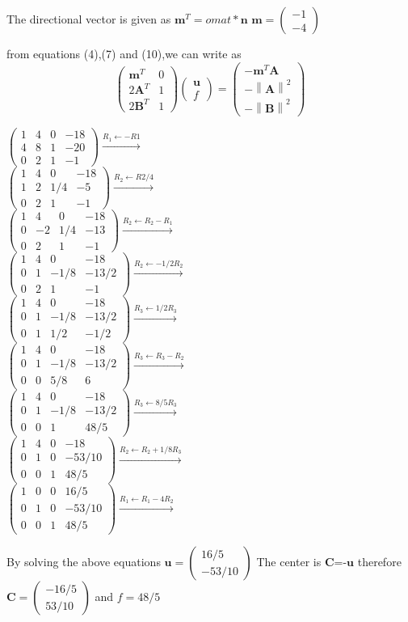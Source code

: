 \documentclass[journal,12pt,twocolumn]
{IEEEtran}
\providecommand{\norm}[1]{\left\lVert#1\right\rVert}
\let\vec\mathbf
\newcommand{\myvec}[1]{\ensuremath{\begin{pmatrix}#1\end{pmatrix}}}
\begin{document}
\begin{center}
The directional vector is given as $\vec{m}^T=omat*\vec{n}$ $\vec{m}=\myvec{-1 \\-4}$
\end{center}
from equations (4),(7) and (10),we can write as 
\begin{equation}
	\myvec{\vec{m}^T & 0 \\ 2\vec{A}^T & 1 \\ 2\vec{B}^T & 1}\myvec{\vec{u} \\ f} = \myvec{-\vec{m}^T\vec{A} \\ -\norm{\vec{A}}^2 \\ -\norm{\vec{B}}^2}
\end{equation}

\begin{center}
$\myvec{1&4&0&-18 \\4 & 8& 1 & -20 \\ 0 & 2 & 1 & -1 } \xrightarrow[]{R_1 \leftarrow -R1 }$\\
$\myvec{1&4&0&-18 \\1 & 2 & 1/4 & -5 \\ 0 & 2 & 1 & -1 } \xrightarrow[]{R_2 \leftarrow R2 / 4 } $\\
$\myvec{1&4&0&-18 \\0 & -2 & 1/4 & -13 \\ 0 & 2 & 1 & -1 } \xrightarrow[]{R_2 \leftarrow  R_2-R_1 }$\\
$\myvec{1&4&0&-18 \\0 & 1 & -1/8 & -13/2 \\ 0 & 2 & 1 & -1 } \xrightarrow[]{R_2 \leftarrow - 1/2R_2 }$\\
$\myvec{1&4&0&-18 \\0 & 1 & -1/8 & -13/2 \\ 0 & 1 & 1/2 & -1/2 } \xrightarrow[]{R_3 \leftarrow 1/2R_3 }$\\
$\myvec{1&4&0&-18 \\0 & 1 & -1/8 & -13/2 \\ 0 & 0 & 5/8 & 6 } \xrightarrow[]{R_3 \leftarrow R_3 -R_2}$\\
$\myvec{1&4&0&-18 \\0 & 1 & -1/8 & -13/2 \\ 0 & 0 & 1 & 48/5 } \xrightarrow[]{R_3 \leftarrow 8/5R_3}$\\
$\myvec{1&4&0&-18 \\0 & 1 & 0 & -53/10 \\ 0 & 0 & 1 & 48/5 } \xrightarrow[]{R_2 \leftarrow R_2+1/8R_3}$\\
$\myvec{1&0&0& 16/5 \\0 & 1 & 0 & -53/10 \\ 0 & 0 & 1 & 48/5 } \xrightarrow[]{R_1 \leftarrow R_1-4R_2}$\\

\end{center}
\begin{center}
By solving the above equations $\vec{u} =\myvec{16/5 \\ -53/10}$
The center is $\vec{C}$=-$\vec{u}$
therefore $\vec{C} = \myvec{-16/5 \\ 53/10}$
 and $f = 48/5$ 

\end{center}
\end{document}

